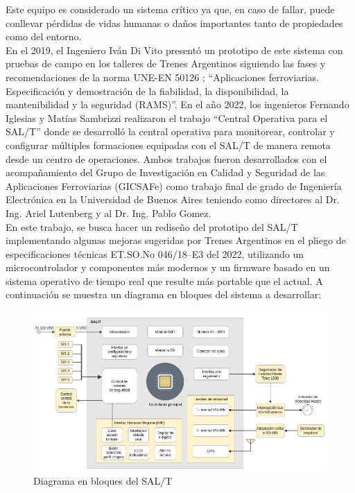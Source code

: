 Este equipo es considerado un sistema crítico ya que, en caso de fallar, puede conllevar pérdidas de vidas humanas o daños importantes tanto de propiedades como del entorno. \\

En el 2019, el Ingeniero Iván Di Vito presentó un prototipo de este sistema con pruebas de campo en los talleres de Trenes Argentinos siguiendo las fases y recomendaciones de la norma UNE-EN 50126 \cite{norma_50126};  ``Aplicaciones ferroviarias. Especificación y demostración de la fiabilidad, la disponibilidad, la mantenibilidad y la seguridad (RAMS)''. En el año 2022, los ingenieros Fernando Iglesias y Matías Sambrizzi realizaron el trabajo “Central Operativa para el SAL/T” donde se desarrolló la central operativa para monitorear, controlar y configurar múltiples formaciones equipadas con el SAL/T de manera remota desde un centro de operaciones. Ambos trabajos fueron desarrollados con el acompañamiento del Grupo de Investigación en Calidad y Seguridad de las Aplicaciones Ferroviarias (GICSAFe) como trabajo final de grado de Ingeniería Electrónica en la Universidad de Buenos Aires teniendo como directores al Dr. Ing. Ariel Lutenberg y al Dr. Ing. Pablo Gomez. \\

En este trabajo, se busca hacer un rediseño del prototipo del SAL/T implementando algunas mejoras sugeridas por Trenes Argentinos en el pliego de especificaciones técnicas ET.SO.No 046/18–E3 del 2022, utilizando un microcontrolador y componentes más modernos y un firmware basado en un sistema operativo de tiempo real que resulte más portable que el actual. A continuación se muestra un diagrama en bloques del sistema a desarrollar: 


\begin{figure}[H]
    \centering
    \includegraphics[width=\linewidth]{img/diagrama_bloques.png}
    \caption{Diagrama en bloques del SAL/T}
    \label{fig:block_diagram}
\end{figure}


